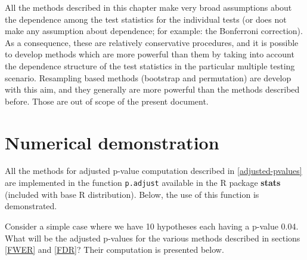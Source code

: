 \documentclass[
]{book}
\begin{document}
All the methods described in this chapter make very broad assumptions about the dependence among the test statistics for the individual tests (or does not make any assumption about dependence; for example: the Bonferroni correction). As a consequence, these are relatively conservative procedures, and it is possible to develop methods which are more powerful than them by taking into account the dependence structure of the test statistics in the particular multiple testing scenario. Resampling based methods (bootstrap and permutation) are develop with this aim, and they generally are more powerful than the methods described before. Those are out of scope of the present document.

\hypertarget{multipletesting-demonstration}{%
\section{Numerical demonstration}\label{multipletesting-demonstration}}

All the methods for adjusted p-value computation described in \ref{adjusted-pvalues} are implemented in the function \texttt{p.adjust} available in the R package \textbf{stats} (included with base R distribution). Below, the use of this function is demonstrated.

Consider a simple case where we have 10 hypotheses each having a p-value 0.04. What will be the adjusted p-values for the various methods described in sections \ref{FWER} and \ref{FDR}? Their computation is presented below.
\end{document}
